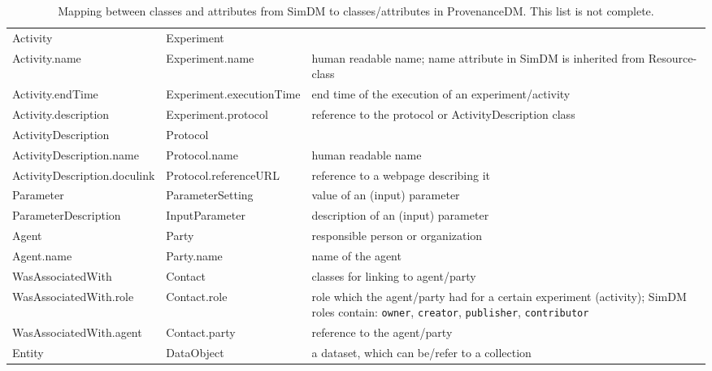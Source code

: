 \begin{table}[ht]
\small
{}\textwidth
\begin{tabulary}{1.0\textwidth}{LLp{5cm}}
\toprule
{} &  & \\
\midrule
Activity               & Experiment      &  \\
Activity.name          & Experiment.name & human readable name; name attribute in SimDM is inherited from Resource-class\\
Activity.endTime & Experiment.executionTime  & end time of the execution of an experiment/activity \\
Activity.description & Experiment.protocol & reference to the protocol or ActivityDescription class \\
ActivityDescription    & Protocol        & \\
ActivityDescription.name  & Protocol.name   & human readable name\\
ActivityDescription.doculink & Protocol.referenceURL & reference to a webpage describing it\\
Parameter              & ParameterSetting     & value of an (input) parameter\\
ParameterDescription   & InputParameter       & description of an (input) parameter\\
Agent           & Party           & responsible person or organization\\
Agent.name      & Party.name      & name of the agent \\
WasAssociatedWith & Contact         & classes for linking to agent/party\\
WasAssociatedWith.role & Contact.role    & role which the agent/party had for a certain experiment (activity); SimDM roles contain: \texttt{owner}, \texttt{creator}, \texttt{publisher}, \texttt{contributor}\\
WasAssociatedWith.agent & Contact.party    & reference to the agent/party \\
Entity        & DataObject     & a dataset, which can be/refer to a collection\\

\bottomrule
\end{tabulary}
\caption[Mapping between classes and attributes from SimDM to classes/attributes in ProvenanceDM]{Mapping between classes and attributes from SimDM to classes/attributes in ProvenanceDM. This list is not complete.}
\label{tab:simdmmapping}
\end{table}

